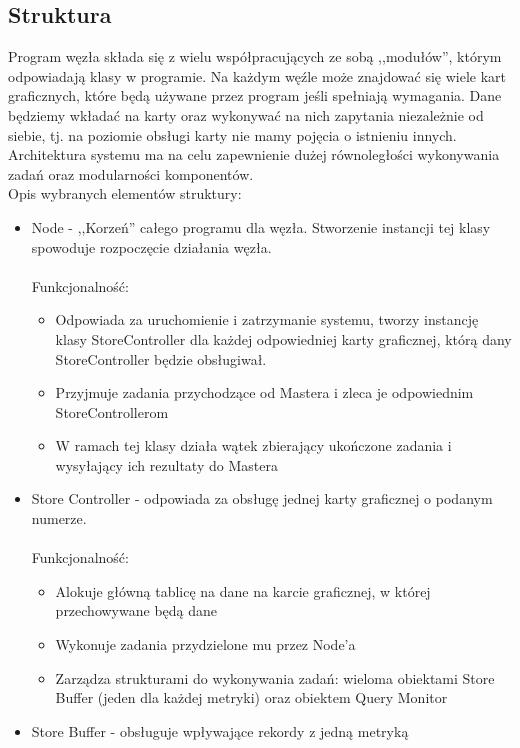 \documentclass[paper=a4, fontsize=11pt]{scrartcl} %
\numberwithin{equation}{section} %
\numberwithin{figure}{section} %
\numberwithin{table}{section} %
\begin{document}
	\subsection{Struktura}
		Program węzła składa się z wielu współpracujących ze sobą ,,modułów'', którym odpowiadają klasy w programie. Na każdym węźle może znajdować się
		wiele kart graficznych, które będą używane przez program jeśli spełniają wymagania. Dane będziemy wkładać na karty oraz wykonywać na nich zapytania
		niezależnie od siebie, tj. na poziomie obsługi karty nie mamy pojęcia o istnieniu innych. Architektura systemu ma na celu zapewnienie dużej 
		równoległości wykonywania zadań oraz modularności komponentów. \\
		Opis wybranych elementów struktury:
		\begin{itemize}
			\item Node - ,,Korzeń'' całego programu dla węzła. Stworzenie instancji tej klasy spowoduje rozpoczęcie działania węzła. \\ \\
				Funkcjonalność: 
				\begin{itemize}
					\item Odpowiada za uruchomienie i zatrzymanie systemu, tworzy instancję klasy StoreController dla każdej odpowiedniej karty
						graficznej, którą dany StoreController będzie obsługiwał.
					\item Przyjmuje zadania przychodzące od Mastera i zleca je odpowiednim StoreControllerom
					\item W ramach tej klasy działa wątek zbierający ukończone zadania i wysyłający ich rezultaty do Mastera
				\end{itemize}
			\item Store Controller - odpowiada za obsługę jednej karty graficznej o podanym numerze. \\ \\
				Funkcjonalność: 
				\begin{itemize}
					\item Alokuje główną tablicę na dane na karcie graficznej, w której przechowywane będą dane
					\item Wykonuje zadania przydzielone mu przez Node'a
					\item Zarządza strukturami do wykonywania zadań: wieloma obiektami Store Buffer (jeden dla każdej metryki) oraz obiektem Query Monitor
				\end{itemize}
			\item Store Buffer - obsługuje wpływające rekordy z jedną metryką \\ \\

\end{itemize}
\end{document}
